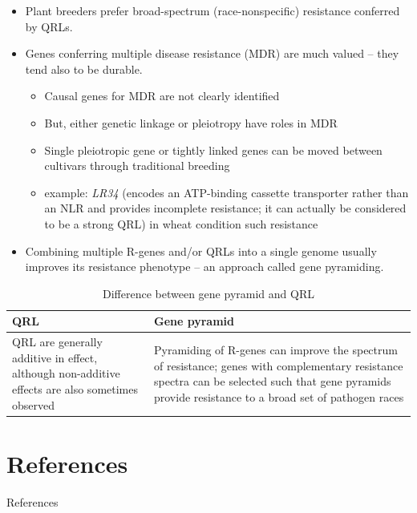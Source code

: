 \documentclass[11pt,dvipsnames,ignorenonframetext,aspectratio=169]{beamer}
\newif\ifbibliography
\providecommand{\tightlist}{%
  \setlength{\itemsep}{0pt}\setlength{\parskip}{0pt}}
\newcommand{\bitemize}{\begin{itemize}}
\newcommand{\eitemize}{\end{itemize}}
\begin{document}
\begin{frame}{}
\protect\hypertarget{section-23}{}
\small

\begin{itemize}
\tightlist
\item
  Plant breeders prefer broad-spectrum (race-nonspecific) resistance
  conferred by QRLs.
\item
  Genes conferring multiple disease resistance (MDR) are much valued --
  they tend also to be durable. \bitemize \footnotesize

  \item

  Causal genes for MDR are not clearly identified

  \item

  But, either genetic linkage or pleiotropy have roles in MDR

  \item

  Single pleiotropic gene or tightly linked genes can be moved between
  cultivars through traditional breeding

  \item

  example: \textit{LR34} (encodes an ATP-binding cassette transporter
  rather than an NLR and provides incomplete resistance;
  \alert{it can actually be considered to be a strong QRL}) in wheat
  condition such resistance \eitemize
\item
  Combining multiple R-genes and/or QRLs into a single genome usually
  improves its resistance phenotype -- an approach called gene
  pyramiding.
\end{itemize}

\begin{table}

\caption{\label{tab:diff-qrl-pyramid}Difference between gene pyramid and QRL}
\centering
\fontsize{6}{8}\selectfont
\begin{tabular}[t]{>{\raggedright\arraybackslash}p{24em}>{\raggedright\arraybackslash}p{30em}}
\toprule
QRL & Gene pyramid\\
\midrule
QRL are generally additive in effect, although non-additive effects are also sometimes observed & Pyramiding of R-genes can improve the spectrum of resistance; genes with complementary resistance spectra can be selected such that gene pyramids provide resistance to a broad set of pathogen races\\
\bottomrule
\end{tabular}
\end{table}
\end{frame}

\hypertarget{references}{%
\section{References}\label{references}}

\begin{frame}{References}
\renewcommand{\bibname}{References} 
\scriptsize
\end{frame}

          \begin{frame}[allowframebreaks]{}
    \bibliographytrue
    
    \end{frame}
  
\end{document}

